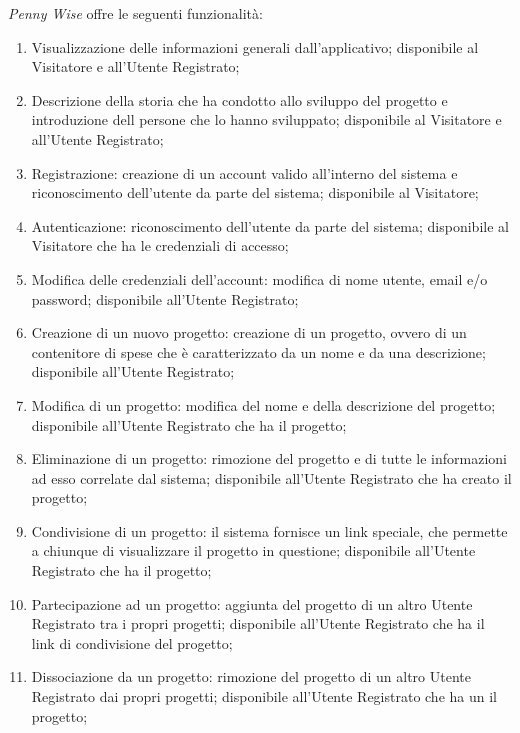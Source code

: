 \textit{Penny Wise} offre le seguenti funzionalità:
\begin{enumerate}
    \item Visualizzazione delle informazioni generali dall'applicativo; disponibile al Visitatore e all'Utente Registrato;

    \item Descrizione della storia che ha condotto allo sviluppo del progetto e 
		introduzione dell persone che lo hanno sviluppato; disponibile al 
		Visitatore e all'Utente Registrato;

    \item Registrazione: creazione di un account valido all'interno del sistema e riconoscimento dell'utente da parte del sistema; disponibile al Visitatore;

    \item Autenticazione: riconoscimento dell'utente da parte del sistema; disponibile al Visitatore che ha le credenziali di accesso;

    \item Modifica delle credenziali dell'account: modifica di nome utente, email e/o password; disponibile all'Utente Registrato;

    \item Creazione di un nuovo progetto: creazione di un progetto, ovvero di un contenitore di spese che è caratterizzato da un nome e da una descrizione; disponibile all'Utente Registrato;

    \item Modifica di un progetto: modifica del nome e della descrizione del progetto; disponibile all'Utente Registrato che ha il progetto;

    \item Eliminazione di un progetto: rimozione del progetto e di tutte le informazioni ad esso correlate dal sistema; disponibile all'Utente Registrato che ha creato il progetto;

    \item Condivisione di un progetto: il sistema fornisce un link speciale, che permette a chiunque di visualizzare il progetto in questione; disponibile all'Utente Registrato che ha il progetto;

    \item Partecipazione ad un progetto: aggiunta del progetto di un altro Utente Registrato tra i propri progetti; disponibile all'Utente Registrato che ha il link di condivisione del progetto;

    \item Dissociazione da un progetto: rimozione del progetto di un altro Utente Registrato dai propri progetti; disponibile all'Utente Registrato che ha un il progetto;


\end{enumerate}
